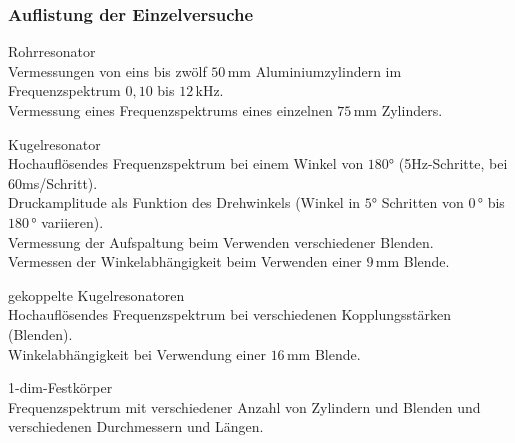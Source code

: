 \subsubsection*{Auflistung der Einzelversuche}
\begin{description}
    \item Rohrresonator\\
    Vermessungen von eins bis zwölf $50\,$mm Aluminiumzylindern im Frequenzspektrum $0,10$ bis $12\,$kHz.\\
    Vermessung eines Frequenzspektrums eines einzelnen $75\,$mm Zylinders.
    \item Kugelresonator\\
    Hochauflösendes Frequenzspektrum bei einem Winkel von $180°$ (5Hz-Schritte, bei 60ms/Schritt).\\
    Druckamplitude als Funktion des Drehwinkels (Winkel in $5°$ Schritten von $0\,°$ bis $180\,°$ variieren).\\
    Vermessung der Aufspaltung beim Verwenden verschiedener Blenden.\\
    Vermessen der Winkelabhängigkeit beim Verwenden einer $9\,$mm Blende.
    \item gekoppelte Kugelresonatoren\\
    Hochauflösendes Frequenzspektrum bei verschiedenen Kopplungsstärken (Blenden).\\
    Winkelabhängigkeit bei Verwendung einer $16\,$mm Blende.\\
    \item 1-dim-Festkörper\\
    Frequenzspektrum mit verschiedener Anzahl von Zylindern und Blenden und verschiedenen Durchmessern und Längen.\\
\end{description}

\label{sec:Durchfuehrung}
